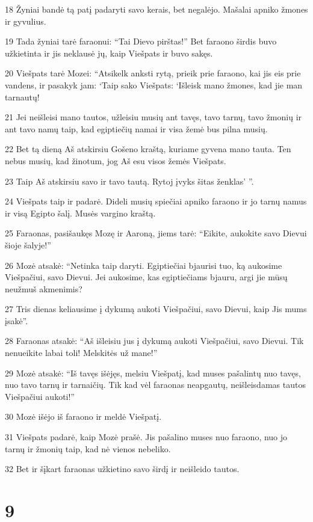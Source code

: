 \par 18 Žyniai bandė tą patį padaryti savo kerais, bet negalėjo. Mašalai apniko žmones ir gyvulius. 
\par 19 Tada žyniai tarė faraonui: “Tai Dievo pirštas!” Bet faraono širdis buvo užkietinta ir jis neklausė jų, kaip Viešpats ir buvo sakęs. 
\par 20 Viešpats tarė Mozei: “Atsikelk anksti rytą, prieik prie faraono, kai jis eis prie vandens, ir pasakyk jam: ‘Taip sako Viešpats: ‘Išleisk mano žmones, kad jie man tarnautų! 
\par 21 Jei neišleisi mano tautos, užleisiu musių ant tavęs, tavo tarnų, tavo žmonių ir ant tavo namų taip, kad egiptiečių namai ir visa žemė bus pilna musių. 
\par 22 Bet tą dieną Aš atskirsiu Gošeno kraštą, kuriame gyvena mano tauta. Ten nebus musių, kad žinotum, jog Aš esu visos žemės Viešpats. 
\par 23 Taip Aš atskirsiu savo ir tavo tautą. Rytoj įvyks šitas ženklas’ ”. 
\par 24 Viešpats taip ir padarė. Dideli musių spiečiai apniko faraono ir jo tarnų namus ir visą Egipto šalį. Musės vargino kraštą. 
\par 25 Faraonas, pasišaukęs Mozę ir Aaroną, jiems tarė: “Eikite, aukokite savo Dievui šioje šalyje!” 
\par 26 Mozė atsakė: “Netinka taip daryti. Egiptiečiai bjaurisi tuo, ką aukosime Viešpačiui, savo Dievui. Jei aukosime, kas egiptiečiams bjauru, argi jie mūsų neužmuš akmenimis? 
\par 27 Tris dienas keliausime į dykumą aukoti Viešpačiui, savo Dievui, kaip Jis mums įsakė”. 
\par 28 Faraonas atsakė: “Aš išleisiu jus į dykumą aukoti Viešpačiui, savo Dievui. Tik nenueikite labai toli! Melskitės už mane!” 
\par 29 Mozė atsakė: “Iš tavęs išėjęs, melsiu Viešpatį, kad muses pašalintų nuo tavęs, nuo tavo tarnų ir tarnaičių. Tik kad vėl faraonas neapgautų, neišleisdamas tautos Viešpačiui aukoti!” 
\par 30 Mozė išėjo iš faraono ir meldė Viešpatį. 
\par 31 Viešpats padarė, kaip Mozė prašė. Jis pašalino muses nuo faraono, nuo jo tarnų ir žmonių taip, kad nė vienos nebeliko. 
\par 32 Bet ir šįkart faraonas užkietino savo širdį ir neišleido tautos.



\chapter{9}


